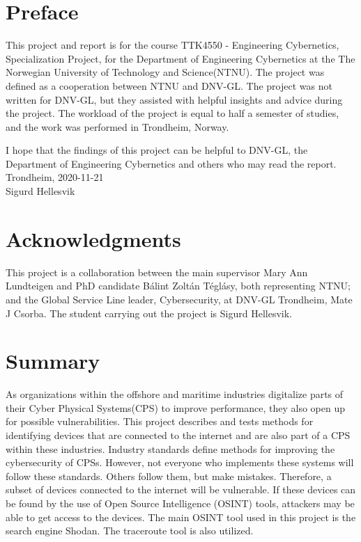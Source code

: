\section*{Preface}
This project and report is for the course TTK4550 - Engineering Cybernetics, Specialization Project, for the Department of Engineering Cybernetics at the The Norwegian University of Technology and Science(NTNU). The project was defined as a cooperation between NTNU and DNV-GL. The project was not written for DNV-GL, but they assisted with helpful insights and advice during the project. The workload of the project is equal to half a semester of studies, and the work was performed in Trondheim, Norway.

I hope that the findings of this project can be helpful to DNV-GL, the Department of Engineering Cybernetics and others who may read the report. 
\\
Trondheim, 2020-11-21
\\
Sigurd Hellesvik
\newpage

\section*{Acknowledgments} \label{sec:ack}
This project is a collaboration between the main supervisor Mary Ann Lundteigen and PhD candidate Bálint Zoltán Téglásy, both representing NTNU; and the Global Service Line leader, Cybersecurity, at DNV-GL Trondheim,  Mate J Csorba. The student carrying out the project is Sigurd Hellesvik.

\section*{Summary}

As organizations within the offshore and maritime industries digitalize parts of their Cyber Physical Systems(CPS) to improve performance, they also open up for possible vulnerabilities. This project describes and tests methods for identifying devices that are connected to the internet and are also part of a CPS within these industries. 
Industry standards define methods for improving the cybersecurity of CPSs. However, not everyone who implements these systems will follow these standards. Others follow them, but make mistakes. Therefore, a subset of devices connected to the internet will be vulnerable. If these devices can be found by the use of Open Source Intelligence (OSINT) tools, attackers may be able to get access to the devices. 
The main OSINT tool used in this project is the search engine Shodan. The traceroute tool is also utilized.

